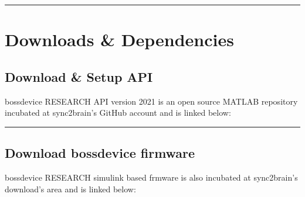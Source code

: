 \documentclass[letterpaper,10pt,english]{sphinxmanual}
\begin{document}
\begin{sphinxVerbatim}[commandchars=\\\{\}]

\end{sphinxVerbatim}


\bigskip\hrule\bigskip



\chapter{Downloads \& Dependencies}
\label{\detokenize{6_downloads_n_dependencies:downloads-dependencies}}\label{\detokenize{6_downloads_n_dependencies::doc}}

\section{Download \& Setup API}
\label{\detokenize{6_downloads_n_dependencies:download-setup-api}}
\sphinxAtStartPar
bossdevice RESEARCH API version 2021 is an open source MATLAB repository incubated at sync2brain’s GitHub account and is linked below:

\begin{sphinxVerbatim}[commandchars=\\\{\}]
\end{sphinxVerbatim}


\bigskip\hrule\bigskip



\section{Download bossdevice firmware}
\label{\detokenize{6_downloads_n_dependencies:download-bossdevice-firmware}}
\sphinxAtStartPar
bossdevice RESEARCH simulink based frmware is also incubated at sync2brain’s download’s area and is linked below:
\end{document}

